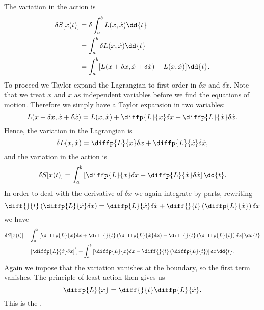 The variation in the action is
\begin{align}
    \delta S[x(t)] &= \delta \int_a^b \lagrangian(x, \dot{x}) \dd{t}\\
    &= \int_a^b \delta \lagrangian (x, \dot{x})\dd{t}\\
    &= \int_a^b [\lagrangian(x + \delta x, \dot{x} + \delta\dot{x}) - \lagrangian(x, \dot{x})] \dd{t}.
\end{align}
To proceed we Taylor expand the Lagrangian to first order in \(\delta x\) and \(\delta \dot{x}\).
Note that we treat \(x\) and \(\dot{x}\) as independent variables before we find the equations of motion.
Therefore we simply have a Taylor expansion in two variables:
\begin{equation}
    \lagrangian(x + \delta x, \dot{x} + \delta\dot{x}) = \lagrangian(x, \dot{x}) + \diffp{\lagrangian}{x}\delta x + \diffp{\lagrangian}{\dot{x}} \delta\dot{x}.
\end{equation}
Hence, the variation in the Lagrangian is
\begin{equation}
    \delta \lagrangian(x, \dot{x}) = \diffp{\lagrangian}{x}\delta x + \diffp{\lagrangian}{\dot{x}}\delta \dot{x},
\end{equation}
and the variation in the action is
\begin{equation}
    \delta S[x(t)] = \int_a^b \left[ \diffp{\lagrangian}{x}\delta x + \diffp{\lagrangian}{\dot{x}}\delta\dot{x} \right]\dd{t}.
\end{equation}
In order to deal with the derivative of \(\delta x\) we again integrate by parts, rewriting
\begin{equation}
    \diff{}{t}\left( \diffp{\lagrangian}{\dot{x}} \delta x \right) = \diffp{\lagrangian}{\dot{x}}\delta\dot{x} + \diff{}{t}\left( \diffp{\lagrangian}{\dot{x}} \right)\delta x
\end{equation}
we have
\begin{align}
    \delta S[x(t)] &= \int_a^b \left[ \diffp{\lagrangian}{x}\delta x + \diff{}{t}\left( \diffp{\lagrangian}{\dot{x}} \delta x \right) - \diff{}{t}\left( \diffp{\lagrangian}{t} \right) \delta x \right] \dd{t}\\
    &= \left[ \diffp{\lagrangian}{\dot{x}} \delta x \right]_a^b + \int_a^b \left[ \diffp{\lagrangian}{x}\delta x - \diff{}{t}\left( \diffp{\lagrangian}{t} \right) \right] \delta x \dd{t}.
\end{align}
Again we impose that the variation vanishes at the boundary, so the first term vanishes.
The principle of least action then gives us
\begin{equation}
    \diffp{\lagrangian}{x} = \diff{}{t}\diffp{\lagrangian}{\dot{x}}.
\end{equation}
This is the .

